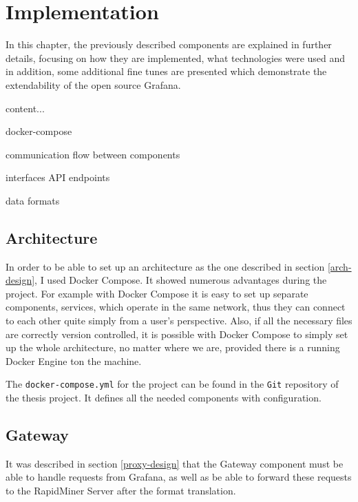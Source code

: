 \chapter{Implementation}

In this chapter, the previously described components are explained in further details, focusing on how they are implemented, what technologies were used and in addition, some additional fine tunes are presented which demonstrate the extendability of the open source Grafana.

\begin{center}
	\begin{itemize}
		content...
	\end{itemize}
	\item docker-compose
	\item communication flow between components
	\item interfaces API endpoints
	\item data formats
\end{center}

\section{Architecture}

In order to be able to set up an architecture as the one described in section \ref{arch-design}, I used Docker Compose. It showed numerous advantages during the project. For example with Docker Compose it is easy to set up separate components, services, which operate in the same network, thus they can connect to each other quite simply from a user's perspective. Also, if all the necessary files are correctly version controlled, it is possible with Docker Compose to simply set up the whole architecture, no matter where we are, provided there is a running Docker Engine ton the machine.

The \texttt{docker-compose.yml} for the project can be found in the \texttt{Git} repository of the thesis project. It defines all the needed components with configuration.

\section{Gateway}

It was described in section \ref{proxy-design} that the Gateway component must be able to handle requests from Grafana, as well as be able to forward these requests to the RapidMiner Server after the format translation. 

